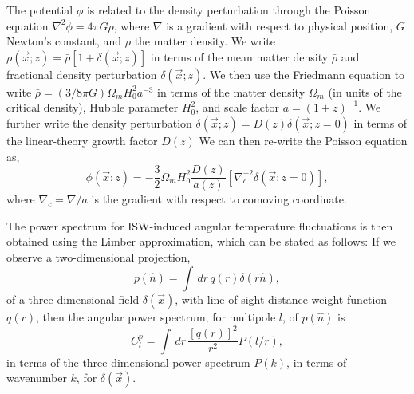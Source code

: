 \documentclass[aps,twocolumn,floats,prd,nofootinbib]{revtex4-1}
\begin{document}
The potential $\phi$ is related to the density perturbation
through the Poisson equation $\nabla^2 \phi = 4 \pi G \rho$,
where $\nabla$ is a gradient with respect to physical position,
$G$ Newton's constant, and $\rho$ the matter density. We write
$\rho(\vec x;z)= \bar\rho [1+\delta(\vec x;z)]$ in terms of the
mean matter density $\bar \rho$ and fractional density
perturbation $\delta(\vec x;z)$.  We then use the Friedmann
equation to write $\bar \rho = (3/8\pi G) \Omega_m H_0^2 a^{-3}$ in
terms of the matter density $\Omega_m$ (in units of the critical
density), Hubble parameter $H_0^2$, and scale factor
$a=(1+z)^{-1}$.  We further write the density perturbation
$\delta(\vec x;z) = D(z) \delta(\vec x;z=0)$ in terms of the
linear-theory growth factor $D(z)$  We can then re-write the
Poisson equation as,
\begin{equation}
     \phi(\vec x;z) = -\frac{3}{2} \Omega_m H_0^2
     \frac{D(z)}{a(z)} \left[ \nabla_c^{-2} \delta(\vec x;z=0)
     \right],
\label{eqn:phik}
\end{equation}
where $\nabla_c=\nabla/a$ is the gradient with respect to
comoving coordinate.

The power spectrum for ISW-induced angular temperature
fluctuations is then obtained using the Limber approximation,
which can be stated as follows:  If we observe a two-dimensional
projection,
\begin{equation}
     p(\hat n) = \int \, dr\, q(r) \delta(r \hat n),
\end{equation}
of a three-dimensional field $\delta(\vec x)$, with
line-of-sight-distance weight function $q(r)$, then the angular
power spectrum, for multipole $l$, of $p(\hat n)$ is
\begin{equation}
     C_l^p = \int \, dr\, \frac{[q(r)]^2}{r^2} P(l/r),
\label{eqn:Limber}
\end{equation}
in terms of the three-dimensional power spectrum $P(k)$, in
terms of wavenumber $k$, for $\delta(\vec x)$.
\end{document}
